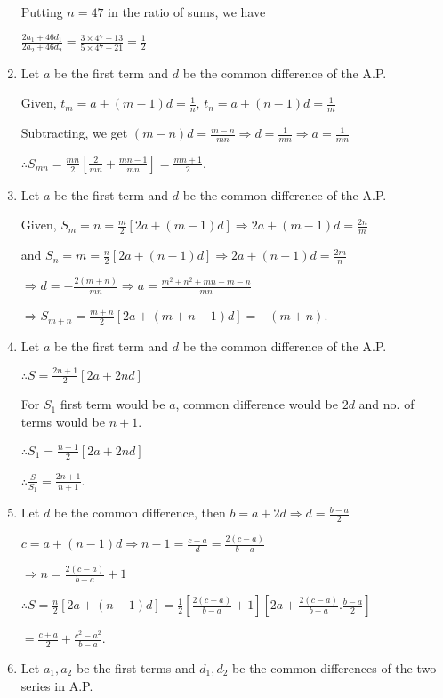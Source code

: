 \begin{enumerate}
  Putting $n = 47$ in the ratio of sums, we have

  $\frac{2a_1 + 46d_1}{2a_2 + 46d_2} = \frac{3\times 47 - 13}{5\times47 + 21} = \frac{1}{2}$
\item Let $a$ be the first term and $d$ be the common difference of the A.P.

  Given, $t_m = a + (m - 1)d = \frac{1}{n},\,t_n = a + (n - 1)d = \frac{1}{m}$

  Subtracting, we get $(m - n)d = \frac{m - n}{mn} \Rightarrow d = \frac{1}{mn} \Rightarrow a = \frac{1}{mn}$

  $\therefore S_{mn} = \frac{mn}{2}\left[\frac{2}{mn} + \frac{mn - 1}{mn}\right] = \frac{mn + 1}{2}$.
\item Let $a$ be the first term and $d$ be the common difference of the A.P.

  Given, $S_m = n = \frac{m}{2}[2a + (m - 1)d] \Rightarrow 2a + (m - 1)d = \frac{2n}{m}$

  and $S_n = m = \frac{n}{2}[2a + (n - 1)d] \Rightarrow 2a + (n - 1)d = \frac{2m}{n}$

  $\Rightarrow d = -\frac{2(m + n)}{mn}\Rightarrow a = \frac{m^2 + n^2 + mn - m - n}{mn}$

  $\Rightarrow S_{m + n} = \frac{m + n}{2}[2a + (m + n - 1)d] = -(m + n)$.
\item Let $a$ be the first term and $d$ be the common difference of the A.P.

  $\therefore S = \frac{2n + 1}{2}[2a + 2nd]$

  For $S_1$ first term would be $a$, common difference would be $2d$ and no. of terms would be $n + 1$.

  $\therefore S_1 = \frac{n + 1}{2}[2a + 2nd]$

  $\therefore \frac{S}{S_1} = \frac{2n + 1}{n +1}$.
\item Let $d$ be the common difference, then $b = a + 2d \Rightarrow d = \frac{b - a}{2}$

  $c = a + (n - 1)d \Rightarrow n - 1 = \frac{c - a}{d} = \frac{2(c - a)}{b - a}$

  $\Rightarrow n = \frac{2(c - a)}{b - a} + 1$

  $\therefore S = \frac{n}{2}[2a + (n - 1)d] = \frac{1}{2}\left[\frac{2(c - a)}{b - a} + 1\right]\left[2a + \frac{2(c - a)}{b -
    a}.\frac{b - a}{2}\right]$

  $= \frac{c + a}{2} + \frac{c^2 - a^2}{b - a}$.
\item Let $a_1, a_2$ be the first terms and $d_1, d_2$ be the common differences of the two series in A.P.


\end{enumerate}
